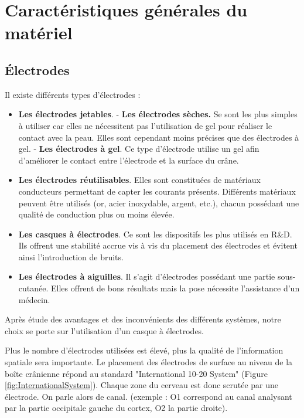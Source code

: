 \section{Caractéristiques générales du matériel}
\label{Section:3.Caractéristiques générales du matériel}

\subsection{Électrodes}
\label{Subsection:3.Électrodes}

Il existe différents types d'électrodes :
\smallbreak
\begin{itemize}
	\item \textbf{Les électrodes jetables}.
	\smallbreak 
	\subitem - \textbf{Les électrodes sèches.} Se sont les plus simples à utiliser car elles ne nécessitent pas l'utilisation de gel pour réaliser le contact avec la peau. Elles sont cependant moins précises que des électrodes à gel.
	\smallbreak
	\subitem - \textbf{Les électrodes à gel}. Ce type d'électrode utilise un gel afin d'améliorer le contact entre l'électrode et la surface du crâne.  
	\smallbreak
	\item \textbf{Les électrodes réutilisables}. Elles sont constituées de matériaux conducteurs permettant de capter les courants présents. Différents matériaux peuvent être utilisés (or, acier inoxydable, argent, etc.), chacun possédant une qualité de conduction plus ou moins élevée. 
	\smallbreak
	\item \textbf{Les casques à électrodes}. Ce sont les dispositifs les plus utilisés en R\&D. Ils offrent une stabilité accrue vis à vis du placement des électrodes et évitent ainsi l'introduction de bruits.
	\smallbreak
	\item \textbf{Les électrodes à aiguilles}. Il s'agit d'électrodes possédant une partie sous-cutanée. Elles offrent de bons résultats mais la pose nécessite l'assistance d'un médecin.
\end{itemize}
\smallbreak
Après étude des avantages et des inconvénients des différents systèmes, notre choix se porte sur l'utilisation d'un casque à électrodes. 

Plus le nombre d'électrodes utilisées est élevé, plus la qualité de l'information spatiale sera importante. Le placement des électrodes de surface au niveau de la boîte crânienne répond au standard "International 10-20 System" (Figure \ref{fig:InternationalSystem}). Chaque zone du cerveau est donc scrutée par une électrode. On parle alors de canal. (exemple : O1 correspond au canal analysant par la partie occipitale gauche du cortex, O2 la partie droite).


